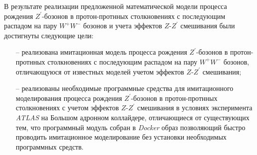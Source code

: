 
В результате реализации предложенной математической модели процесса рождения ${Z}^{\prime}$-бозонов в протон-протнных столкновениях с последующим распадом на пару ${W}^{+}{W}^{-}$ бозонов и учета эффектов $Z$-${Z}^{\prime}$ смешивания были достигнуты следующие цели: 
\begin{enumerate}
	\item[--] реализована имитационная модель процесса рождения ${Z}^{\prime}$-бозонов в протон-протнных столкновениях с последующим распадом на пару ${W}^{+}{W}^{-}$ бозонов, отличающуюся от известных моделей учетом эффектов $Z$-${Z}^{\prime}$ смешивания;
	\item[--] реализованы необходимые программные средства для имитационного моделирования процесса
	рождения ${Z}^{\prime}$-бозонов в протон-протнных столкновениях с учетом эффектов $Z$-${Z}^{\prime}$ смешивания в условиях эксперимента \textit{ATLAS} на Большом адронном коллайдере, отличающиеся от существующих тем, что программный модуль собран в \textit{Docker} образ позволяющий быстро проводить имитационное моделирование без установки необходимых программных средств.
\end{enumerate}
